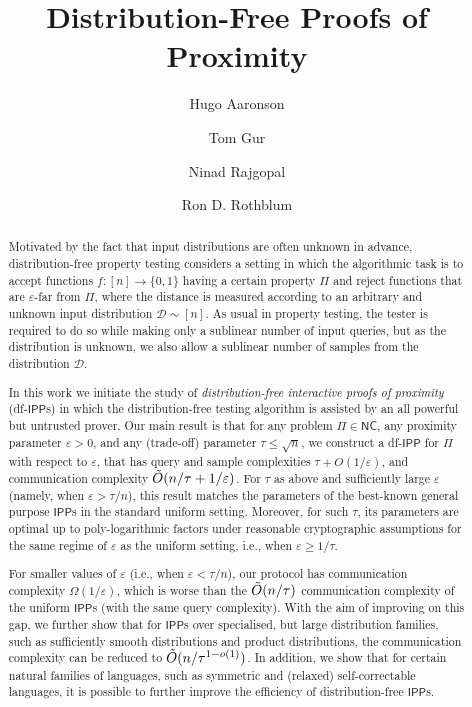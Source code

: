 \documentclass[11pt]{article}
\author[1]{Hugo Aaronson}
\author[1]{Tom Gur}
\author[1]{Ninad Rajgopal}
\author[2]{Ron D. Rothblum}
\affil[1]{University of Cambridge, \texttt{\href{mailto:ha406@cam.ac.uk}{ha406@cam.ac.uk}, \href{mailto:tom.gur@cl.cam.ac.uk}{tom.gur@cl.cam.ac.uk},\href{mailto:nr549@cam.ac.uk}{nr549@cam.ac.uk}}}
\affil[2]{Technion, \texttt{\href{mailto:rothblum@cs.technion.ac.il}{rothblum@cs.technion.ac.il}}}
\date{}
\title{Distribution-Free Proofs of Proximity}
\newcommand{\NC}{\mathsf{NC}}
\newcommand{\IPP}{\mathsf{IPP}}
\newcommand{\sD}{\mathcal{D}}
\newcommand{\eps}{\varepsilon}
\begin{document}
\maketitle

\begin{abstract}

Motivated by the fact that input distributions are often unknown in advance, distribution-free property testing considers a setting in which the algorithmic task is to accept functions $f : [n] \to \{0,1\}$ having a certain property $\Pi$ and reject functions that are $\varepsilon$-far from $\Pi$, where the distance is measured according to an arbitrary and unknown input distribution $\sD \sim [n]$. As usual in property testing, the tester is required to do so while making only a sublinear number of input queries, but as the distribution is unknown, we also allow a sublinear number of samples from the distribution $\sD$. 

In this work we initiate the study of \emph{distribution-free interactive proofs of proximity} (df-$\IPP$s) in which the distribution-free testing algorithm is assisted by an all powerful but untrusted prover. Our main result is that for any problem $\Pi \in \NC$, any proximity parameter $\eps > 0$, and any (trade-off) parameter $\tau\leq\sqrt{n}$, we construct a df-$\IPP$ for $\Pi$ with respect to $\eps$, that has query and sample complexities $\tau+O(1/\eps)$, and communication complexity $\Tilde{O}(n/\tau + 1/\eps)$. For $\tau$ as above and sufficiently large $\eps$ (namely, when $\eps > \tau/n$), this result matches the parameters of the best-known general purpose $\IPP$s in the standard uniform setting. Moreover, for such $\tau$, its parameters are optimal up to poly-logarithmic factors under reasonable cryptographic assumptions for the same regime of $\eps$ as the uniform setting, i.e., when $\eps \geq 1/\tau$. 

For smaller values of $\eps$ (i.e., when $\eps < \tau/n$), our protocol has communication complexity $\Omega(1/\eps)$, which is worse than the $\Tilde{O}(n/\tau)$ communication complexity of the uniform $\IPP$s (with the same query complexity). With the aim of improving on this gap, we further show that for $\IPP$s over specialised, but large distribution families, such as sufficiently smooth distributions and product distributions, the communication complexity can be reduced to $\Tilde{O}(n/\tau^{1-o(1)})$. In addition, we show that for certain natural families of languages, such as symmetric and (relaxed) self-correctable languages, it is possible to further improve the efficiency of distribution-free $\IPP$s.

\end{abstract}
\thispagestyle{empty}
\end{document}
